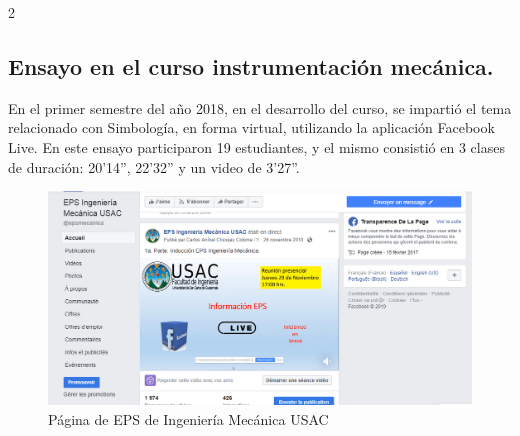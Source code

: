 \documentclass[11pt,spanish,Letterpaper,openany]{book}
\begin{document}
\begin {multicols}{2}
\hypertarget{ensayo-en-el-curso-instrumentacion-mecanica.}{%
\subsection{Ensayo en el curso instrumentación mecánica.}\label{ensayo-en-el-curso-instrumentacion-mecanica.}}

En el primer semestre del año 2018, en el desarrollo del curso, se impartió el tema relacionado con Simbología, en forma virtual, utilizando la aplicación Facebook Live. En este ensayo participaron 19 estudiantes, y el mismo consistió en 3 clases de duración: 20'14'', 22'32'' y un video de 3'27''.

\end {multicols}

\begin{figure}[H]

{\centering \includegraphics[width=0.8\linewidth]{images/201901-cchicojay-imagen01} 

}

\caption{Página de EPS de Ingeniería Mecánica USAC}\label{fig:unnamed-chunk-32}
\end{figure}
\end{document}
